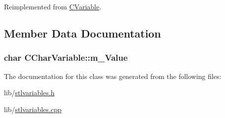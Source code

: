 Reimplemented from \hyperlink{classCVariable_a7c536a5709d8df5d9d75013370288c79}{C\-Variable}.



\subsection{Member Data Documentation}
\hypertarget{classCCharVariable_a0e76b26ffd276425d7bf5fe80dd118f2}{
\subsubsection[{m\-\_\-\-Value}]{\setlength{\rightskip}{0pt plus 5cm}char C\-Char\-Variable\-::m\-\_\-\-Value\hspace{0.3cm}{\ttfamily [protected]}}}\label{classCCharVariable_a0e76b26ffd276425d7bf5fe80dd118f2}


The documentation for this class was generated from the following files\-:\begin{DoxyCompactItemize}
\item 
lib/\hyperlink{stlvariables_8h}{stlvariables.\-h}\item 
lib/\hyperlink{stlvariables_8cpp}{stlvariables.\-cpp}\end{DoxyCompactItemize}
